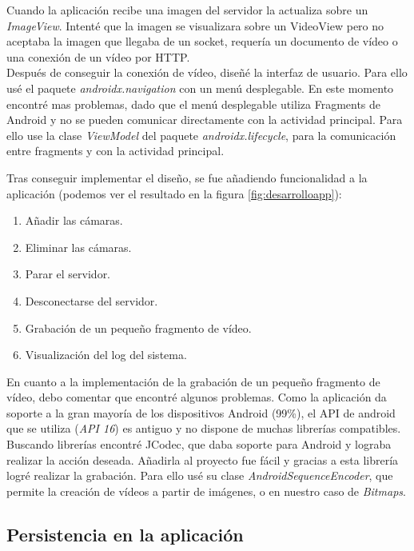 Cuando la aplicación recibe una imagen del servidor la actualiza sobre un \textit{ImageView}. Intenté que la imagen se visualizara sobre un VideoView pero no aceptaba la imagen que llegaba de un socket, requería un documento de vídeo o una conexión de un vídeo por HTTP.\\

Después de conseguir la conexión de vídeo, diseñé la interfaz de usuario.
Para ello usé el paquete \textit{androidx.navigation} con un menú desplegable. 
En este momento encontré mas problemas, dado que el menú desplegable utiliza Fragments de Android y no se pueden comunicar directamente con la actividad principal.
Para ello use la clase \textit{ViewModel} del paquete \textit{androidx.lifecycle}, para la comunicación entre fragments y con la actividad principal.


Tras conseguir implementar el diseño, se fue añadiendo funcionalidad a la aplicación (podemos ver el resultado en la figura \ref{fig:desarrolloapp}):
\begin{enumerate}
	\item Añadir las cámaras.
	\item Eliminar las cámaras.
	\item Parar el servidor.
	\item Desconectarse del servidor.
	\item Grabación de un pequeño fragmento de vídeo.
	\item Visualización del log del sistema.
\end{enumerate}

En cuanto a la implementación de la grabación de un pequeño fragmento de vídeo, debo comentar que encontré algunos problemas. Como la aplicación da soporte a la gran mayoría de los dispositivos Android (99\%), el API de android que se utiliza (\textit{API 16}) es antiguo y no dispone de muchas librerías compatibles. Buscando librerías encontré JCodec, que daba soporte para Android y lograba realizar la acción deseada. Añadirla al proyecto fue fácil y gracias a esta librería logré realizar la grabación. Para ello usé su clase \textit{AndroidSequenceEncoder}, que permite la creación de vídeos a partir de imágenes, o en nuestro caso de \textit{Bitmaps}.

\subsection{Persistencia en la aplicación}


